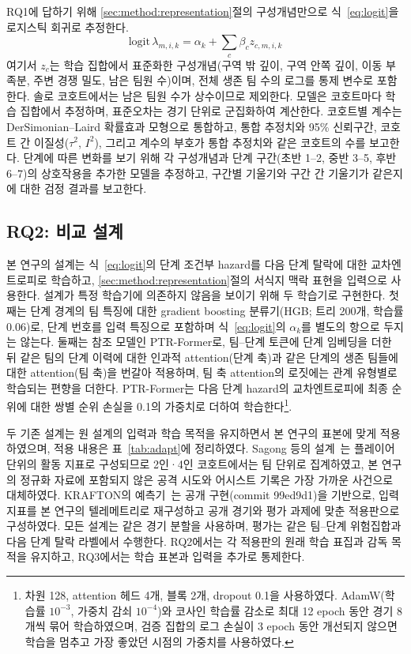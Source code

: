 RQ1에 답하기 위해 \ref{sec:method:representation}절의 구성개념만으로 식~\eqref{eq:logit}을 로지스틱 회귀로 추정한다.
\begin{equation}
\mathrm{logit}\,\lambda_{m,i,k}=\alpha_k+\sum_{c}\beta_c z_{c,m,i,k}
\label{eq:ehm}
\end{equation}
여기서 $z_c$는 학습 집합에서 표준화한 구성개념(구역 밖 깊이, 구역 안쪽 깊이, 이동 부족분, 주변 경쟁 밀도, 남은 팀원 수)이며, 전체 생존 팀 수의 로그를 통제 변수로 포함한다.
솔로 코호트에서는 남은 팀원 수가 상수이므로 제외한다.
모델은 코호트마다 학습 집합에서 추정하며, 표준오차는 경기 단위로 군집화하여 계산한다.
코호트별 계수는 DerSimonian--Laird 확률효과 모형으로 통합하고, 통합 추정치와 95\% 신뢰구간, 코호트 간 이질성($\tau^2$, $I^2$), 그리고 계수의 부호가 통합 추정치와 같은 코호트의 수를 보고한다.
단계에 따른 변화를 보기 위해 각 구성개념과 단계 구간(초반 1--2, 중반 3--5, 후반 6--7)의 상호작용을 추가한 모델을 추정하고, 구간별 기울기와 구간 간 기울기가 같은지에 대한 검정 결과를 보고한다.

\subsection{RQ2: 비교 설계}
\label{sec:method:rq2}

본 연구의 설계는 식~\eqref{eq:logit}의 단계 조건부 hazard를 다음 단계 탈락에 대한 교차엔트로피로 학습하고, \ref{sec:method:representation}절의 서식지 맥락 표현을 입력으로 사용한다.
설계가 특정 학습기에 의존하지 않음을 보이기 위해 두 학습기로 구현한다.
첫째는 단계 경계의 팀 특징에 대한 gradient boosting 분류기(HGB; 트리 200개, 학습률 0.06)로, 단계 번호를 입력 특징으로 포함하며 식~\eqref{eq:logit}의 $\alpha_k$를 별도의 항으로 두지는 않는다.
둘째는 참조 모델인 PTR-Former로, 팀--단계 토큰에 단계 임베딩을 더한 뒤 같은 팀의 단계 이력에 대한 인과적 attention(단계 축)과 같은 단계의 생존 팀들에 대한 attention(팀 축)을 번갈아 적용하며, 팀 축 attention의 로짓에는 관계 유형별로 학습되는 편향을 더한다.
PTR-Former는 다음 단계 hazard의 교차엔트로피에 최종 순위에 대한 쌍별 순위 손실을 0.1의 가중치로 더하여 학습한다\footnote{차원 128, attention 헤드 4개, 블록 2개, dropout 0.1을 사용하였다. AdamW(학습률 $10^{-3}$, 가중치 감쇠 $10^{-4}$)와 코사인 학습률 감소로 최대 12 epoch 동안 경기 8개씩 묶어 학습하였으며, 검증 집합의 로그 손실이 3 epoch 동안 개선되지 않으면 학습을 멈추고 가장 좋았던 시점의 가중치를 사용하였다.}.

두 기존 설계는 원 설계의 입력과 학습 목적을 유지하면서 본 연구의 표본에 맞게 적용하였으며, 적용 내용은 표~\ref{tab:adapt}에 정리하였다.
Sagong 등의 설계~\cite{Sagong25a}는 플레이어 단위의 활동 지표로 구성되므로 2인·4인 코호트에서는 팀 단위로 집계하였고, 본 연구의 정규화 자료에 포함되지 않은 공격 시도와 어시스트 기록은 가장 가까운 사건으로 대체하였다.
KRAFTON의 예측기~\cite{KRAFTON}는 공개 구현(commit 99ed9d1)을 기반으로, 입력 지표를 본 연구의 텔레메트리로 재구성하고 공개 경기와 평가 과제에 맞춘 적용판으로 구성하였다.
모든 설계는 같은 경기 분할을 사용하며, 평가는 같은 팀--단계 위험집합과 다음 단계 탈락 라벨에서 수행한다.
RQ2에서는 각 적용판의 원래 학습 표집과 감독 목적을 유지하고, RQ3에서는 학습 표본과 입력을 추가로 통제한다.

